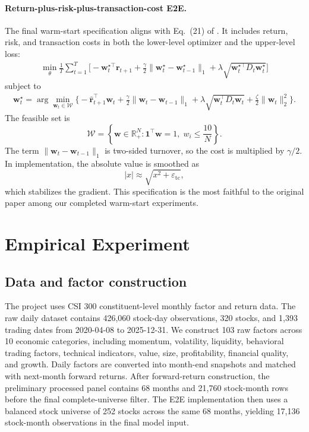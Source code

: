 \documentclass[11pt]{article}
\begin{document}
\paragraph{Return-plus-risk-plus-transaction-cost E2E.}
The final warm-start specification aligns with Eq.~(21) of \citet{wang2026mlmm}. It includes return, risk, and transaction costs in both the lower-level optimizer and the upper-level loss:
\begin{equation}
\begin{aligned}
    \min_{\theta}\frac{1}{T}\sum_{t=1}^{T}
    \bigg[
    -\bm w_t^{\star\top}\bm r_{t+1}
    +\frac{\gamma}{2}\|\bm w_t^\star-\bm w_{t-1}^\star\|_1
    +\lambda\sqrt{\bm w_t^{\star\top}D_t\bm w_t^\star}
    \bigg]
\end{aligned}
\label{eq:return_risk_tc_outer}
\end{equation}
subject to
\begin{equation}
\begin{aligned}
    \bm w_t^\star
    =
    \arg\min_{\bm w_t\in\mathcal{W}}
    \bigg\{
    -\widehat{\bm r}_{t+1}^{\top}\bm w_t
    +\frac{\gamma}{2}\|\bm w_t-\bm w_{t-1}\|_1
    +\lambda\sqrt{\bm w_t^\top D_t\bm w_t}
    +\frac{\zeta}{2}\|\bm w_t\|_2^2
    \bigg\}.
\end{aligned}
\label{eq:return_risk_tc_inner}
\end{equation}
The feasible set is
\[
    \mathcal{W}
    =
    \left\{
    \bm w\in\mathbb{R}^{N}_{+}:
    \bm 1^\top\bm w=1,\;
    w_i\le \frac{10}{N}
    \right\}.
\]
The term $\|\bm w_t-\bm w_{t-1}\|_1$ is two-sided turnover, so the cost is multiplied by $\gamma/2$. In implementation, the absolute value is smoothed as
\[
    |x|\approx \sqrt{x^2+\varepsilon_{\mathrm{tc}}},
\]
which stabilizes the gradient. This specification is the most faithful to the original paper among our completed warm-start experiments.

\section{Empirical Experiment}

\subsection{Data and factor construction}

The project uses CSI 300 constituent-level monthly factor and return data. The raw daily dataset contains 426,060 stock-day observations, 320 stocks, and 1,393 trading dates from 2020-04-08 to 2025-12-31. We construct 103 raw factors across 10 economic categories, including momentum, volatility, liquidity, behavioral trading factors, technical indicators, value, size, profitability, financial quality, and growth. Daily factors are converted into month-end snapshots and matched with next-month forward returns. After forward-return construction, the preliminary processed panel contains 68 months and 21,760 stock-month rows before the final complete-universe filter. The E2E implementation then uses a balanced stock universe of 252 stocks across the same 68 months, yielding 17,136 stock-month observations in the final model input.
\end{document}
